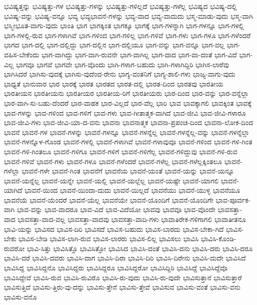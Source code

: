 {ಭವಿಷ್ಯತ್ತನ್ನು
ಭವಿಷ್ಯತ್ತು-ಗಳ
ಭವಿಷ್ಯತ್ತು-ಗಳನ್ನು
ಭವಿಷ್ಯತ್ತು-ಗಳಿಲ್ಲದೆ
ಭವಿಷ್ಯತ್ತು-ಗಳೆಲ್ಲ
ಭವಿಷ್ಯದ
ಭವಿಷ್ಯ-ದಲ್ಲಿ
ಭವಿಷ್ಯ-ವನ್ನು
ಭವಿಷ್ಯ-ವನ್ನೂ
ಭವ್ಯ
ಭವ್ಯಭಾವನೆ-ಗಳನ್ನು
ಭವ್ಯ-ವಾದ
ಭವ್ಯ-ವಾದುದು
ಭಸ್ಮ-ಮಾಡು-ವುದು
ಭಸ್ಮ-ವಾಗಿ
ಭಸ್ಮೀಭೂತ-ವಾಗು-ವುದು
ಭಾಂತಿ
ಭಾಗ
ಭಾಗಕ್ಕಿಂತ
ಭಾಗಕ್ಕೂ
ಭಾಗಕ್ಕೆ
ಭಾಗ-ಗಳನ್ನಾಗಿ
ಭಾಗ-ಗಳನ್ನೂ
ಭಾಗ-ಗಳಲ್ಲಿ
ಭಾಗ-ಗಳಲ್ಲಿ-ರುವ
ಭಾಗ-ಗಳಾಗಿವೆ
ಭಾಗ-ಗಳಿಂದ
ಭಾಗ-ಗಳಿಲ್ಲ
ಭಾಗ-ಗಳಿವೆ
ಭಾಗ-ಗಳು
ಭಾಗ-ಗಳೂ
ಭಾಗ-ಗಳೆಂದರೆ
ಭಾಗದ
ಭಾಗ-ದಲ್ಲಿ
ಭಾಗ-ದಲ್ಲಿದ್ದು
ಭಾಗ-ದಲ್ಲಿನ
ಭಾಗ-ದಲ್ಲಿಯೂ
ಭಾಗ-ವನ್ನು
ಭಾಗ-ವನ್ನೂ
ಭಾಗ-ವಲ್ಲ
ಭಾಗ-ವಹಿಸ-ಬೇಕೆಂದು
ಭಾಗ-ವಾಗಿದ್ದು
ಭಾಗ-ವಾಗಿ-ರುವನೇ
ಭಾಗ-ವಾಗಿಲ್ಲ
ಭಾಗ-ವಾದ
ಭಾಗ-ವಾ-ದಂತೆ
ಭಾಗ-ವಿದೆ
ಭಾಗ-ವಿಲ್ಲ
ಭಾಗವೂ
ಭಾಗವೆ
ಭಾಗವೇ
ಭಾಗ-ವೊಂದು
ಭಾಗಿ-ಗಳಾಗ-ಬಹುದು
ಭಾಗಿ-ಗಳಾಗಿದ್ದಿರಿ
ಭಾಗಿಸ-ಲಾರೆವು
ಭಾಗಿಸಿದರೆ
ಭಾಗಿಸು-ವುದಕ್ಕೆ
ಭಾಗಿಸು-ವುದೆಂದ-ರೇನು
ಭಾಗ್ಯ-ವಂತನಿಗೆ
ಭಾಗ್ಯ-ಶಾಲಿ-ಗಳು
ಭಾಜ್ಯ-ವಾಗು-ವುದು
ಭಾಧ್ಯತೆ
ಭಾನುವಾರ
ಭಾರ
ಭಾರಕ್ಕೆ
ಭಾರತ
ಭಾರತದ
ಭಾರತ-ದಲ್ಲಿ
ಭಾರತ-ದಿಂದ
ಭಾರತವು
ಭಾರತೀಯ
ಭಾರತೀಯನ
ಭಾರತೀಯನು
ಭಾರತೀಯರ
ಭಾರತೀಯ-ರಿಗೆ
ಭಾರತೀಯರು
ಭಾರ-ದಿಂದ
ಭಾರ-ವನ್ನು
ಭಾರ-ವನ್ನೆಲ್ಲಾ
ಭಾರ-ವಾಗಿ-ಸು-ಬಹು-ದೆಂದರೆ
ಭಾರ-ವಾಹಕ
ಭಾರ-ವಿಲ್ಲದೆ
ಭಾರ-ವೆಲ್ಲ
ಭಾರಿ
ಭಾವ
ಭಾವಕ್ಕಾಗಲಿ
ಭಾವಕ್ಕಿಂತ
ಭಾವಕ್ಕೆ
ಭಾವ-ಗಳನ್ನು
ಭಾವ-ಗಳಿಂದ
ಭಾವ-ಗಳಿಗೆ
ಭಾವ-ಗಳು
ಭಾವ-ಗೀತಾತ್ಮಕ-ವಾಗಿದೆ
ಭಾವ-ಜೀವಿ
ಭಾವ-ಜೀವಿ-ಗಳಾರೂ
ಭಾವ-ಜೀವಿ-ಗಳು
ಭಾವ-ಜೀವಿ-ಯಾ-ದ-ವನು
ಭಾವನಾ
ಭಾವನಾತ್ಮಕ
ಭಾವನಾ-ಪ್ರಪಂಚ-ದಿಂದ
ಭಾವನಾ-ಲೋಕ-ದಿಂದ
ಭಾವನೆ
ಭಾವನೆ-ಗಳ
ಭಾವನೆ-ಗಳನ್ನು
ಭಾವನೆ-ಗಳನ್ನೂ
ಭಾವನೆ-ಗಳನ್ನೆಲ್ಲ
ಭಾವನೆ-ಗಳನ್ನೆಲ್ಲ-ವನ್ನು
ಭಾವನೆ-ಗಳನ್ನೆಲ್ಲಾ
ಭಾವನೆ-ಗಳನ್ನೊಳ-ಗೊಂಡ
ಭಾವನೆ-ಗಳಲ್ಲಿ
ಭಾವನೆ-ಗಳಾಗಿವೆ
ಭಾವನೆ-ಗಳಾವುವೂ
ಭಾವನೆ-ಗಳಿಂದ
ಭಾವನೆ-ಗಳಿ-ಗಿಂತ
ಭಾವನೆ-ಗಳಿ-ಗಿಂತಲೂ
ಭಾವನೆ-ಗಳಿಗೂ
ಭಾವನೆ-ಗಳಿಗೆ
ಭಾವನೆ-ಗಳಿಗೆಲ್ಲ
ಭಾವನೆ-ಗಳಿದ್ದುವು
ಭಾವನೆ-ಗಳಿ-ರುವ
ಭಾವನೆ-ಗಳಿವೆ
ಭಾವನೆ-ಗಳು
ಭಾವನೆ-ಗಳೂ
ಭಾವನೆ-ಗಳೆಂದರೆ
ಭಾವನೆ-ಗಳೆಲ್ಲ
ಭಾವನೆ-ಗಳೆಲ್ಲಕ್ಕಿಂತಲೂ
ಭಾವನೆ-ಗಳೆಲ್ಲಾ
ಭಾವನೆ-ಗಳೇ
ಭಾವನೆ-ಗಿಂತ
ಭಾವನೆಗೆ
ಭಾವನೆಯ
ಭಾವನೆ-ಯಂತೆ
ಭಾವನೆ-ಯನ್ನು
ಭಾವನೆ-ಯನ್ನೂ
ಭಾವನೆ-ಯನ್ನೆಲ್ಲ
ಭಾವನೆ-ಯನ್ನೇ
ಭಾವನೆ-ಯಲ್ಲಿ
ಭಾವನೆ-ಯಲ್ಲೆಲ್ಲ
ಭಾವನೆ-ಯಷ್ಟೇ
ಭಾವನೆ-ಯಾಗಲಿ
ಭಾವನೆ-ಯಾಗಿದೆ
ಭಾವನೆ-ಯಿಂದ
ಭಾವನೆ-ಯಿಂದಾ-ದುದು
ಭಾವನೆ-ಯಿಲ್ಲದೆ
ಭಾವನೆಯು
ಭಾವನೆ-ಯುಳ್ಳ
ಭಾವನೆಯೂ
ಭಾವನೆಯೆ
ಭಾವನೆ-ಯೆಂದರೆ
ಭಾವನೆ-ಯೆಲ್ಲ
ಭಾವನೆಯೇ
ಭಾವನೆ-ಯೊಂದಿಗೆ
ಭಾವನೆ-ಯೊಂದಿಗೇ
ಭಾವ-ಪೂರ್ವಕ-ವಾಗಿ
ಭಾವ-ವನ್ನು
ಭಾವ-ವಾದರೂ
ಭಾವ-ವಿದೆ
ಭಾವ-ವಿದೆಯೋ
ಭಾವವು
ಭಾವವೂ
ಭಾವ-ವೊಂದೇ
ಭಾವಸತ್ತಾ-ವಾದ
ಭಾವಸತ್ತಾ-ವಾದ-ವಲ್ಲ
ಭಾವಸತ್ತಾ-ವಾದವು
ಭಾವಸತ್ತಾ-ವಾದಿ-ಗಳು
ಭಾವಾತಿರೇಕ-ಗಳಿಗಾಗಲಿ
ಭಾವಾತೀತನೂ
ಭಾವಿ-ಯನ್ನು
ಭಾವಿಸದ
ಭಾವಿಸ-ದಿರಿ
ಭಾವಿಸದೆ
ಭಾವಿಸ-ಬಹುದು
ಭಾವಿಸ-ಬಾರದು
ಭಾವಿಸ-ಬೇಕಾ-ಗಿದೆ
ಭಾವಿಸ-ಬೇಕು
ಭಾವಿಸ-ಬೇಡಿ
ಭಾವಿಸ-ಲಾಗಿ-ರುವ
ಭಾವಿಸ-ಲಾರರು
ಭಾವಿಸ-ಲಿಲ್ಲ
ಭಾವಿಸಲು
ಭಾವಿಸಿ
ಭಾವಿಸಿ-ಕೊಂಡಿ-ರುವರೋ
ಭಾವಿ-ಸಿತ್ತು
ಭಾವಿಸಿತ್ತೊ
ಭಾವಿಸಿತ್ತೋ
ಭಾವಿಸಿದ
ಭಾವಿಸಿ-ದಂತೆ
ಭಾವಿಸಿ-ದನು
ಭಾವಿಸಿ-ದರು
ಭಾವಿಸಿ-ದರೂ
ಭಾವಿಸಿ-ದರೆ
ಭಾವಿಸಿ-ದವರು
ಭಾವಿಸಿ-ದಾಗ
ಭಾವಿಸಿ-ದಿರಾ
ಭಾವಿಸಿ-ದಿರಿ
ಭಾವಿಸಿ-ದಿರೇನು
ಭಾವಿಸಿ-ದುದೇ
ಭಾವಿಸಿದೆ
ಭಾವಿಸಿದ್ದ
ಭಾವಿಸಿದ್ದನೊ
ಭಾವಿಸಿದ್ದರು
ಭಾವಿಸಿದ್ದರೂ
ಭಾವಿಸಿದ್ದರೋ
ಭಾವಿಸಿದ್ದಿರಿ
ಭಾವಿಸಿದ್ದೆ
ಭಾವಿಸಿದ್ದೆವೊ
ಭಾವಿಸಿದ್ದೇವೆ
ಭಾವಿಸಿ-ರುವ
ಭಾವಿಸಿ-ರುವಿರೊ
ಭಾವಿಸಿ-ರು-ವುದು
ಭಾವಿಸಿ-ರು-ವುದೇ
ಭಾವಿಸುತ್ತಾನೆ
ಭಾವಿಸುತ್ತಾರೆ
ಭಾವಿಸುತ್ತಿದೆ
ಭಾವಿಸು-ತ್ತಿರು-ವು-ದನ್ನು
ಭಾವಿಸು-ತ್ತೇನೆ
ಭಾವಿಸು-ತ್ತೇವೆ
ಭಾವಿಸುವ
ಭಾವಿಸು-ವಂತೆ
ಭಾವಿಸು-ವನು
ಭಾವಿಸು-ವನೊ
}
